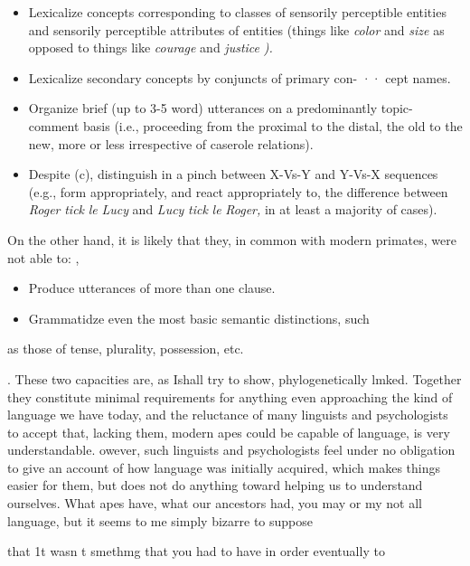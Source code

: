 \begin{itemize}
\item Lexicalize concepts corresponding to classes of sensorily perceptible entities and sensorily perceptible attributes of entities (things like \textit{color} and \textit{size} as opposed to things like \textit{courage} and \textit{justice} \textit{).}
\item Lexicalize secondary concepts by conjuncts of primary con- ·· cept names.
\item Organize brief (up to 3-5 word) utterances on a predominantly topic-comment basis (i.e., proceeding from the proximal to the distal, the old to the new, more or less irrespective of case\-role relations).
\item Despite (c), distinguish in a pinch between X-Vs-Y and Y-Vs-X sequences (e.g., form appropriately, and react appropriately to, the difference between \textit{Roger} \textit{tick} \textit{le} \textit{Lucy} and \textit{Lucy} \textit{tick} \textit{le} \textit{Roger,} in at least a majority of cases).
\end{itemize}

On the other hand, it is likely that they, in common with modern primates, were not able to: ,


\begin{itemize}
\item Produce utterances of more than one clause.
\item Grammatidze even the most basic semantic distinctions, such
\end{itemize}

as those of tense, plurality, possession, etc.

. These two capacities are, as Ishall try to show, phylogenetically lmked. Together they constitute minimal requirements for anything even approaching the kind of language we have today, and the reluc\-tance of many linguists and psychologists to accept that, lacking them, modern apes could be capable of language, is very understandable. owever, such linguists and psychologists feel under no obligation to give an account of how language was initially acquired, which makes things easier for them, but does not do anything toward helping us to understand ourselves. What apes have, what our ancestors had, you may or my not all language, but it seems to me simply bizarre to suppose

that 1t wasn t smethmg that you had to have in order eventually to

